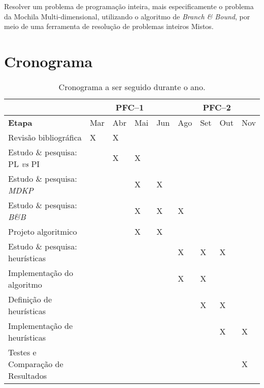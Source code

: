 \documentclass[a4paper,10pt]{article}
\newcommand{\fw}[1]{\emph{#1}}
\begin{document}
Resolver um problema de programação inteira, mais especificamente o problema da
Mochila Multi-dimensional, utilizando o algoritmo de \fw{Branch \& Bound}, por 
meio de uma ferramenta de resolução de problemas inteiros Mistos.

\section{Cronograma}
\label{sec:cron}

\begin{table}[h]
       \centering
       \begin{tabular}{|l|p{.7cm}|p{.7cm}|p{.7cm}|p{.7cm}|p{.7cm}|p{.7cm}|p{.7cm}|p{.7cm}|}
               \cline{2-9}
               \multicolumn{1}{c|}{} & \multicolumn{4}{|c|}{\bf PFC--1} &
\multicolumn{4}{|c|}{\bf PFC--2}\\
               \hline \textbf{Etapa} & Mar & Abr & Mai & Jun & Ago & Set & Out & Nov \\
               \hline Revisão bibliográfica & X & X & & & & & & \\
               \hline Estudo \& pesquisa: PL \fw{vs} PI & & X & X & & & & & \\
	       \hline Estudo \& pesquisa: \fw{MDKP} & & & X & X & & & & \\
	       \hline Estudo \& pesquisa: \fw{B\&B} & & & X & X & X & & & \\
               \hline Projeto algoritmico & & & X & X & & & &\\
               \hline Estudo \& pesquisa: heurísticas & & & & & X & X & X & \\
               \hline Implementação do algoritmo & & & & & X & X & & \\
	       \hline Definição de heurísticas & & & & & & X & X & \\
	       \hline Implementação de heurísticas & & & & & & & X & X \\
               \hline Testes e Comparação de Resultados & & & & & & & & X \\
	       \cline{1-9}
       \end{tabular}
       \caption{Cronograma a ser seguido durante o ano.}
\end{table}
\end{document}
